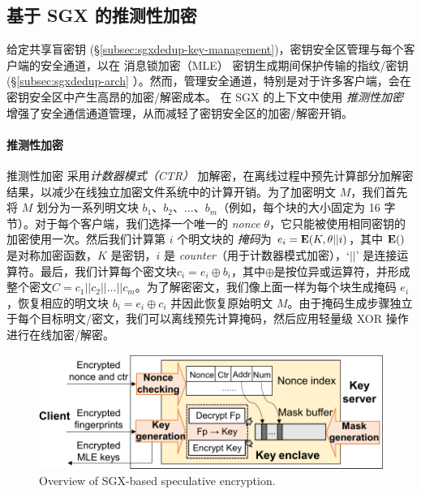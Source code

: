 \subsection{基于 SGX 的推测性加密}
\label{subsec:sgxdedup-encryption}

给定共享盲密钥 (\S\ref{subsec:sgxdedup-key-management})，密钥安全区管理与每个客户端的安全通道，以在 消息锁加密（MLE） 密钥生成期间保护传输的指纹/密钥 (\S\ref{subsec:sgxdedup-arch} ）。然而，管理安全通道，特别是对于许多客户端，会在密钥安全区中产生高昂的加密/解密成本。 \sysnameS 在 SGX 的上下文中使用 \textit{ 推测性加密} \cite{eduardo19} 增强了安全通信通道管理，从而减轻了密钥安全区的加密/解密开销。

\paragraph*{推测性加密} 推测性加密 \cite{eduardo19} 采用\textit{计数器模式（CTR）} \cite{counter} 加解密，在离线过程中预先计算部分加解密结果，以减少在线独立加密文件系统中的计算开销。为了加密明文 $M$，我们首先将 $M$ 划分为一系列明文块 $b_1、b_2、\ldots、b_m$（例如，每个块的大小固定为 16 字节）。对于每个客户端，我们选择一个唯一的 \textit{ nonce} $\theta$，它只能被使用相同密钥的加密使用一次。然后我们计算第 $i$ 个明文块的 \textit{掩码}为 $e_i = {\bf E}(K, \theta || i)$，其中 ${\bf E}()$ 是对称加密函数，$K$ 是密钥，$i$ 是 \textit{ counter}（用于计数器模式加密），`$||$' 是连接运算符。最后，我们计算每个密文块$c_i = e_i \oplus b_i $，其中$\oplus$是按位异或运算符，并形成整个密文$C = c_1 || c_2 || \ldots || c_m$。为了解密密文，我们像上面一样为每个块生成掩码 $e_i$，恢复相应的明文块 $b_i = e_i \oplus c_i$ 并因此恢复原始明文 $M$。由于掩码生成步骤独立于每个目标明文/密文，我们可以离线预先计算掩码，然后应用轻量级 XOR 操作进行在线加密/解密。

\begin{figure}[t]
\centering
\includegraphics[width=\textwidth]{pic/sgxdedup/encryption.pdf}
\caption{Overview of SGX-based speculative encryption.}
\label{fig:sgxdedup-SpecEnc}
\end{figure}

